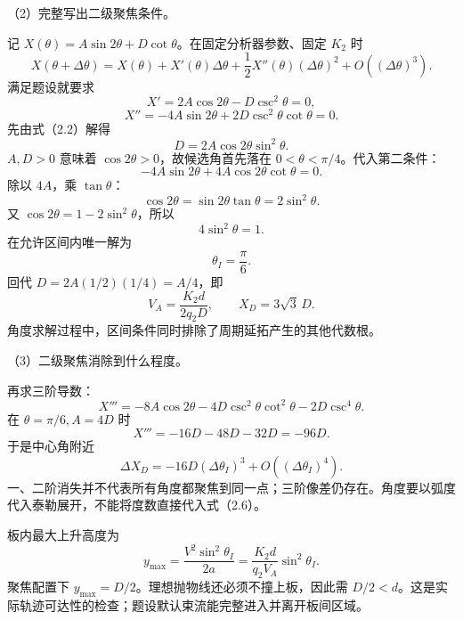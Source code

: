 \documentclass[12pt,a4paper,fontset=fandol]{ctexart}
\begin{document}
（2）完整写出二级聚焦条件。

记 \(X(\theta)=A\sin2\theta+D\cot\theta\)。在固定分析器参数、固定
\(K_2\) 时 \[
X(\theta+\Delta\theta)
=X(\theta)+X'(\theta)\Delta\theta
+\frac12X''(\theta)(\Delta\theta)^2+O((\Delta\theta)^3).
\] 满足题设就要求 \[
X'=2A\cos2\theta-D\csc^2\theta=0,\tag{2.2}
\] \[
X''=-4A\sin2\theta+2D\csc^2\theta\cot\theta=0.\tag{2.3}
\] 先由式（2.2）解得 \[
D=2A\cos2\theta\sin^2\theta.
\] \(A,D>0\) 意味着 \(\cos2\theta>0\)，故候选角首先落在
\(0<\theta<\pi/4\)。代入第二条件： \[
-4A\sin2\theta+4A\cos2\theta\cot\theta=0.
\] 除以 \(4A\)，乘 \(\tan\theta\)： \[
\cos2\theta=\sin2\theta\tan\theta=2\sin^2\theta.
\] 又 \(\cos2\theta=1-2\sin^2\theta\)，所以 \[
4\sin^2\theta=1.
\] 在允许区间内唯一解为 \[
\boxed{\theta_I=\frac{\pi}{6}.}\tag{2.4}
\] 回代 \(D=2A(1/2)(1/4)=A/4\)，即 \[
\boxed{V_A=\frac{K_2d}{2q_2D},\qquad
X_D=3\sqrt3\,D.}\tag{2.5}
\] 角度求解过程中，区间条件同时排除了周期延拓产生的其他代数根。

（3）二级聚焦消除到什么程度。

再求三阶导数： \[
X'''=-8A\cos2\theta
-4D\csc^2\theta\cot^2\theta
-2D\csc^4\theta.
\] 在 \(\theta=\pi/6,A=4D\) 时 \[
X'''=-16D-48D-32D=-96D.
\] 于是中心角附近 \[
\boxed{\Delta X_D=-16D(\Delta\theta_I)^3
+O((\Delta\theta_I)^4).}\tag{2.6}
\]
一、二阶消失并不代表所有角度都聚焦到同一点；三阶像差仍存在。角度要以弧度代入泰勒展开，不能将度数直接代入式（2.6）。

\begin{center}
\begin{minipage}{\linewidth}
\centering\begingroup
{}
\ifdim\wd\diagrambox>.88\linewidth
\sbox{\diagrambox}{\resizebox{.88\linewidth}{!}{\usebox{\diagrambox}}}
\fi
\ifdim\ht\diagrambox>.40\textheight
\resizebox{!}{.40\textheight}{\usebox{\diagrambox}}
\else\usebox{\diagrambox}\fi
\par{}
\endgroup\end{minipage}
\end{center}

板内最大上升高度为 \[
y_{\max}=\frac{V^2\sin^2\theta_I}{2a}
=\frac{K_2d}{q_2V_A}\sin^2\theta_I.
\] 聚焦配置下 \(y_{\max}=D/2\)。理想抛物线还必须不撞上板，因此需
\(D/2<d\)。这是实际轨迹可达性的检查；题设默认束流能完整进入并离开板间区域。
\end{document}
